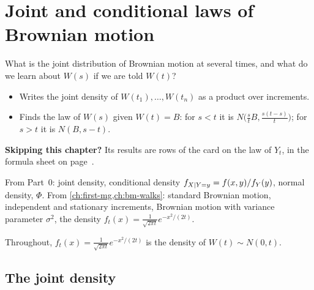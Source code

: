\chapter{Joint and conditional laws of Brownian motion}
\label{ch:joint}

\begin{question}
What is the joint distribution of Brownian motion at several times, and what do we learn about $W(s)$ if we are told $W(t)$?
\end{question}

\begin{whatfor}
\begin{itemize}
  \item Writes the joint density of $W(t_1),\dots,W(t_n)$ as a product over increments.
  \item Finds the law of $W(s)$ given $W(t)=B$: for $s<t$ it is $N\big(\frac stB,\frac{s(t-s)}{t}\big)$; for $s>t$ it is $N(B,s-t)$.
\end{itemize}
\par\smallskip\textbf{Skipping this chapter?} Its results are rows of the card on the law of $Y_t$, in the formula sheet on page~\pageref{fs:drift}.
\end{whatfor}

\begin{prereq}
From Part~0: joint density, conditional density $f_{X\mid Y=y}=f(x,y)/f_Y(y)$, normal density, $\Phi$. From \cref{ch:first-mg,ch:bm-walks}: standard Brownian motion, independent and stationary increments, Brownian motion with variance parameter $\sigma^2$, the density $f_t(x)=\frac{1}{\sqrt{2\pi t}}e^{-x^2/(2t)}$.
\end{prereq}

Throughout, $f_t(x)=\frac{1}{\sqrt{2\pi t}}e^{-x^2/(2t)}$ is the density of $W(t)\sim N(0,t)$.

\section{The joint density}

